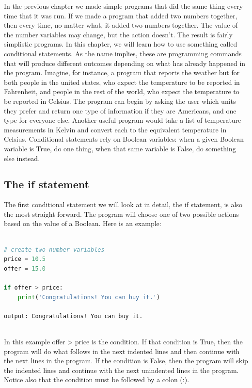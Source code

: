 \documentclass[]{article}
\begin{document}
In the previous chapter we made simple programs that did the same thing every time that it was run.  If we made a program that added two numbers together, then every time, no matter what, it added two numbers together.  The value of the number variables may change, but the action doesn't. The result is fairly simplistic programs.  In this chapter, we will learn how to use something called conditional statements.  As the name implies, these are programming commands that will produce different outcomes depending on what has already happened in the program. Imagine, for instance, a program that reports the weather but for both people in the united states, who expect the temperature to be reported in Fahrenheit, and people in the rest of the world, who expect the temperature to be reported in Celsius.  The program can begin by asking the user which units they prefer and return one type of information if they are Americans, and one type for everyone else.  Another useful program would take a list of temperature measurements in Kelvin and convert each to the equivalent temperature in Celsius.  Conditional statements rely on Boolean variables: when a given Boolean variable is True, do one thing, when that same variable is False, do something else instead.

\subsection{ The if statement }

The first conditional statement we will look at in detail, the if statement, is also the most straight forward.  The program will choose one of two possible actions based on the value of a Boolean.  Here is an example:

\begin{lstlisting}[language=python]

# create two number variables
price = 10.5
offer = 15.0

if offer > price:
    print('Congratulations! You can buy it.')
    
output: Congratulations! You can buy it.
    
\end{lstlisting}

In this example offer > price is the condition.  If that condition is True, then the program will do what follows in the next indented lines and then continue with the next lines in the program. If the condition is False, then the program will skip the indented lines and continue with the next unindented lines in the program. Notice also that the condition must be followed by a colon (:).
\end{document}
